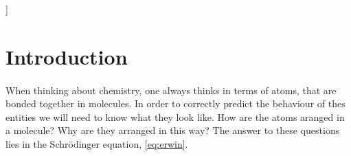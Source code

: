 \documentclass[twoside,twocolumn,9pt]{article}
\begin{document}
]

\renewcommand*\rmdefault{bch}\normalfont\upshape
\rmfamily
\section*{}
\vspace{-1cm}










\section{Introduction}

\paragraph*{}
When thinking about chemistry, one always thinks in terms of atoms, that are bonded together in molecules. In order to correctly predict the behaviour of
thes entities we will need to know what they look like. How are the atoms aranged in a molecule? Why are they arranged in this way? The answer to these
questions lies in the Schrödinger equation, \eqref{eq:erwin}.
\end{document}
